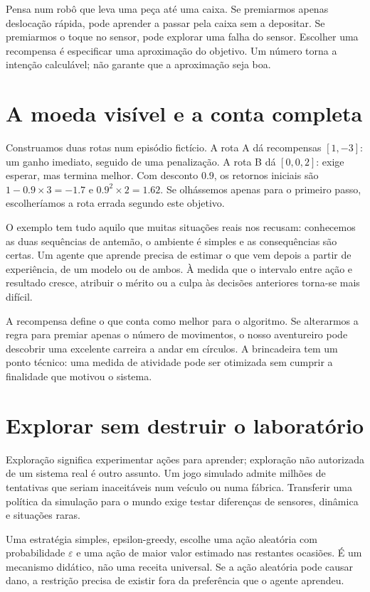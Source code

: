 Pensa num robô que leva uma peça até uma caixa. Se premiarmos apenas deslocação rápida, pode aprender a passar pela caixa sem a depositar. Se premiarmos o toque no sensor, pode explorar uma falha do sensor. Escolher uma recompensa é especificar uma aproximação do objetivo. Um número torna a intenção calculável; não garante que a aproximação seja boa.

\section{A moeda visível e a conta completa}
Construamos duas rotas num episódio fictício. A rota A dá recompensas $[1,-3]$: um ganho imediato, seguido de uma penalização. A rota B dá $[0,0,2]$: exige esperar, mas termina melhor. Com desconto $0.9$, os retornos iniciais são $1-0.9\times3=-1.7$ e $0.9^2\times2=1.62$. Se olhássemos apenas para o primeiro passo, escolheríamos a rota errada segundo este objetivo.

O exemplo tem tudo aquilo que muitas situações reais nos recusam: conhecemos as duas sequências de antemão, o ambiente é simples e as consequências são certas. Um agente que aprende precisa de estimar o que vem depois a partir de experiência, de um modelo ou de ambos. À medida que o intervalo entre ação e resultado cresce, atribuir o mérito ou a culpa às decisões anteriores torna-se mais difícil.

A recompensa define o que conta como melhor para o algoritmo. Se alterarmos a regra para premiar apenas o número de movimentos, o nosso aventureiro pode descobrir uma excelente carreira a andar em círculos. A brincadeira tem um ponto técnico: uma medida de atividade pode ser otimizada sem cumprir a finalidade que motivou o sistema.

\section{Explorar sem destruir o laboratório}
Exploração significa experimentar ações para aprender; exploração não autorizada de um sistema real é outro assunto. Um jogo simulado admite milhões de tentativas que seriam inaceitáveis num veículo ou numa fábrica. Transferir uma política da simulação para o mundo exige testar diferenças de sensores, dinâmica e situações raras.

Uma estratégia simples, epsilon-greedy, escolhe uma ação aleatória com probabilidade $\varepsilon$ e uma ação de maior valor estimado nas restantes ocasiões. É um mecanismo didático, não uma receita universal. Se a ação aleatória pode causar dano, a restrição precisa de existir fora da preferência que o agente aprendeu.


